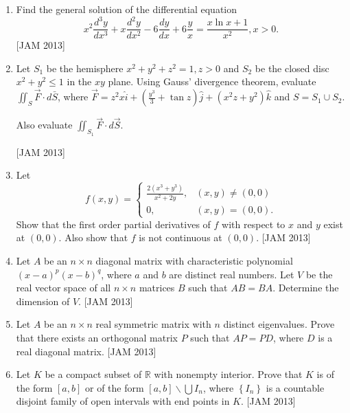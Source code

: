 \begin{enumerate}
by changing the order of integration.
$$
\int_{1 / 4}^{1} \int_{\sqrt{x-x^{2}}}^{\sqrt{x}} \frac{x^{2}-y^{2}}{x^{2}} d y d x
$$
\hfill [JAM 2013]


\item  Find the general solution of the differential equation
$$
x^{2} \frac{d^{3} y}{d x^{3}}+x \frac{d^{2} y}{d x^{2}}-6 \frac{d y}{d x}+6 \frac{y}{x}=\frac{x \ln x+1}{x^{2}}, x>0 .
$$
\hfill [JAM 2013]


\item  Let $S_{1}$ be the hemisphere $x^{2}+y^{2}+z^{2}=1, z>0$ and $S_{2}$ be the closed disc $x^{2}+y^{2} \leq 1$ in the $x y$ plane. Using Gauss' divergence theorem, evaluate $\iint_{S} \vec{F} \cdot d \bar{S}$, where $\vec{F}=z^{2} x \hat{i}+\left(\frac{y^{3}}{3}+\tan z\right) \hat{j}+\left(x^{2} z+y^{2}\right) \hat{k}$ and $S=S_{1} \cup S_{2}$.

Also evaluate $\iint_{S_{1}} \vec{F} \cdot d \vec{S}$.

\hfill [JAM 2013]


\item  Let
$$
f(x, y)= \begin{cases}\frac{2\left(x^{3}+y^{3}\right)}{x^{2}+2 y}, & (x, y) \neq(0,0) \\ 0, & (x, y)=(0,0) .\end{cases}
$$
Show that the first order partial derivatives of $f$ with respect to $x$ and $y$ exist at $(0,0)$. Also show that $f$ is not continuous at $(0,0)$.
\hfill [JAM 2013]



\item  Let $A$ be an $n \times n$ diagonal matrix with characteristic polynomial $(x-a)^{p}(x-b)^{q}$, where $a$ and $b$ are distinct real numbers. Let $V$ be the real vector space of all $n \times n$ matrices $B$ such that $A B=B A$. Determine the dimension of $V$.
\hfill [JAM 2013]



\item  Let $A$ be an $n \times n$ real symmetric matrix with $n$ distinct eigenvalues. Prove that there exists an orthogonal matrix $P$ such that $A P=P D$, where $D$ is a real diagonal matrix.
\hfill [JAM 2013]



\item  Let $K$ be a compact subset of $\mathbb{R}$ with nonempty interior. Prove that $K$ is of the form $[a, b]$ or of the form $[a, b] \backslash \bigcup I_{n}$, where $\left\{I_{n}\right\}$ is a countable disjoint family of open intervals with end points in $K$.
\hfill [JAM 2013]




\end{enumerate}
